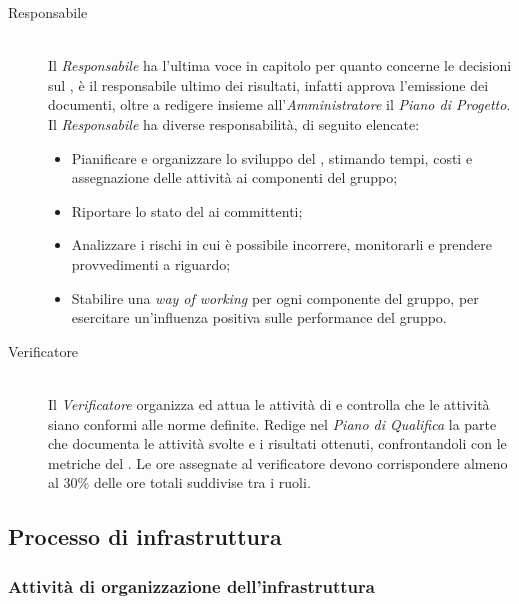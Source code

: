 \begin{description}
\item[Responsabile] \hfill \\ Il \textit{Responsabile} ha l'ultima voce in capitolo per quanto concerne le decisioni sul , \`e il responsabile ultimo dei risultati, infatti approva l'emissione dei documenti, oltre a redigere insieme all'\textit{Amministratore} il \textit{Piano di Progetto}. Il \textit{Responsabile} ha diverse responsabilit\`a, di seguito elencate:
  \begin{itemize}

  \item Pianificare e organizzare lo sviluppo del , stimando tempi, costi e assegnazione delle attivit\`a ai componenti del gruppo;
  \item Riportare lo stato del  ai committenti;
  \item Analizzare i rischi in cui è possibile incorrere, monitorarli e prendere provvedimenti a riguardo;
  \item Stabilire una \textit{way of working} per ogni componente del gruppo, per esercitare un'influenza positiva sulle performance del gruppo.
    
  \end{itemize}

\item[Verificatore] \hfill \\ Il \textit{Verificatore} organizza ed attua le attivit\`a di  e controlla che le attivit\`a siano conformi alle norme definite. Redige nel \textit{Piano di Qualifica} la parte che documenta le attivit\`a svolte e i risultati ottenuti, confrontandoli con le metriche del \PianoDiQualifica. Le ore assegnate al verificatore devono corrispondere almeno al 30\% delle ore totali suddivise tra i ruoli.
  
\end{description}


\subsection{Processo di infrastruttura}

\subsubsection{Attività di organizzazione dell'infrastruttura}

